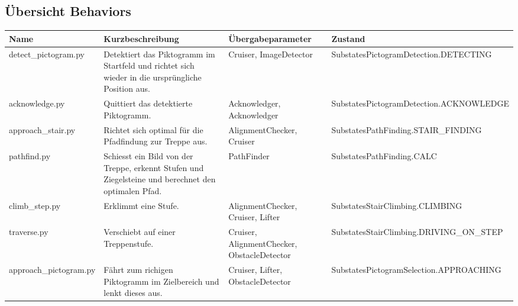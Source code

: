 \subsection{Übersicht Behaviors}
\label{subsec:behavior-overview}
\begin{center}
\begin{table}[H]
\begin{tabularx}{\textwidth}{|X|X|X|X|}
\hline
\textbf{Name} & \textbf{Kurzbeschreibung} & \textbf{Übergabeparameter} & \textbf{Zustand} \\
\hline
detect\_pictogram.py & Detektiert das Piktogramm im Startfeld und richtet sich wieder in die ursprüngliche Position aus. & Cruiser, ImageDetector & SubstatesPictogramDetection.DETECTING \\
\hline
acknowledge.py & Quittiert das detektierte Piktogramm. & Acknowledger, Acknowledger & SubstatesPictogramDetection.ACKNOWLEDGE \\
\hline
approach\_stair.py & Richtet sich optimal für die Pfadfindung zur Treppe aus. & AlignmentChecker, Cruiser & SubstatesPathFinding.STAIR\_FINDING \\
\hline
pathfind.py & Schiesst ein Bild von der Treppe, erkennt Stufen und Ziegelsteine und berechnet den optimalen Pfad. & PathFinder & SubstatesPathFinding.CALC \\
\hline
climb\_step.py & Erklimmt eine Stufe. & AlignmentChecker, Cruiser, Lifter & SubstatesStairClimbing.CLIMBING \\
\hline
traverse.py & Verschiebt auf einer Treppenstufe. & Cruiser, AlignmentChecker, ObstacleDetector & SubstatesStairClimbing.DRIVING\_ON\_STEP \\
\hline
approach\_pictogram.py & Fährt zum richigen Piktogramm im Zielbereich und lenkt dieses aus. & Cruiser, Lifter, ObstacleDetector & SubstatesPictogramSelection.APPROACHING \\
\hline
\end{tabularx}
\label{tab:behaviorübersicht1}
\end{table}
\end{center}

